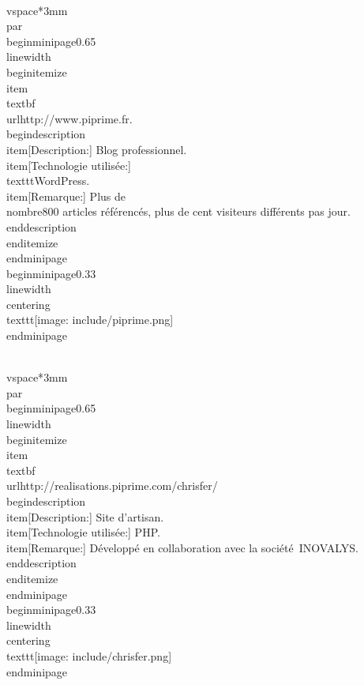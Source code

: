 \documentclass[]{extarticle}
\begin{document}
\\vspace*{3mm}\\par
\\begin{minipage}{0.65\\linewidth}
  \\begin{itemize}
  \\item \\textbf{\\url{http://www.piprime.fr}}.
    \\begin{description}
    \\item[Description:] Blog professionnel.
    \\item[Technologie utilisée:] \\texttt{WordPress}.
    \\item[Remarque:] Plus de \\nombre{800} articles référencés, plus de
      cent visiteurs différents pas jour.
    \\end{description}
  \\end{itemize}
\\end{minipage}
\\begin{minipage}{0.33\\linewidth}
  \\centering
  \\texttt{[image: include/piprime.png]}
\\end{minipage}

\\vspace*{3mm}\\par
\\begin{minipage}{0.65\\linewidth}
  \\begin{itemize}
  \\item \\textbf{\\url{http://realisations.piprime.com/chrisfer/}}
    \\begin{description}
    \\item[Description:] Site d'artisan.
    \\item[Technologie utilisée:] PHP.
    \\item[Remarque:] Développé en collaboration avec la société~INOVALYS.
    \\end{description}
  \\end{itemize}
\\end{minipage}
\\begin{minipage}{0.33\\linewidth}
  \\centering
  \\texttt{[image: include/chrisfer.png]}
\\end{minipage}
\end{document}
